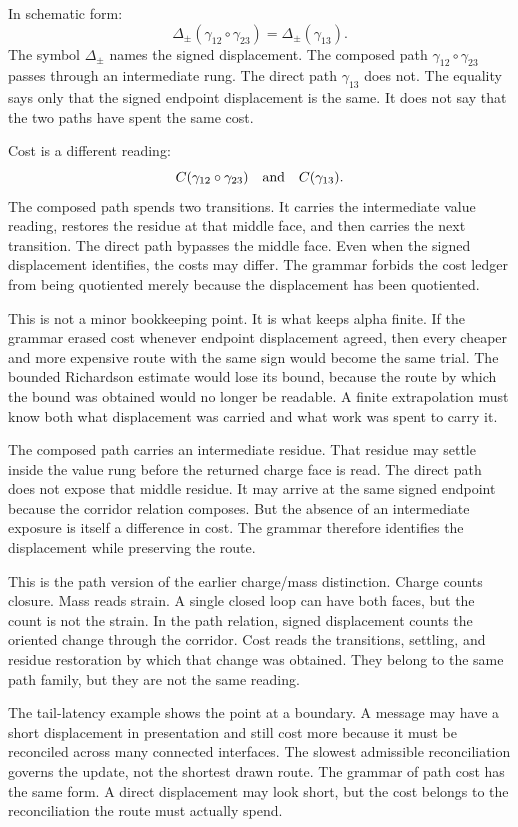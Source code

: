 In schematic form:
\[
  \Delta_{\pm}(\gamma_{12}\circ\gamma_{23})
    = \Delta_{\pm}(\gamma_{13}) .
\]
The symbol \(\Delta_{\pm}\) names the signed displacement. The composed path
\(\gamma_{12}\circ\gamma_{23}\) passes through an intermediate rung. The
direct path \(\gamma_{13}\) does not. The equality says only that the signed
endpoint displacement is the same. It does not say that the two paths have
spent the same cost.

Cost is a different reading:
\[
  C(\gamma_{12}\circ\gamma_{23})
    \quad\hbox{and}\quad
  C(\gamma_{13}) .
\]
The composed path spends two transitions. It carries the intermediate value
reading, restores the residue at that middle face, and then carries the next
transition. The direct path bypasses the middle face. Even when the signed
displacement identifies, the costs may differ. The grammar forbids the cost
ledger from being quotiented merely because the displacement has been
quotiented.

This is not a minor bookkeeping point. It is what keeps alpha finite. If the
grammar erased cost whenever endpoint displacement agreed, then every cheaper
and more expensive route with the same sign would become the same trial. The
bounded Richardson estimate would lose its bound, because the route by which
the bound was obtained would no longer be readable. A finite extrapolation
must know both what displacement was carried and what work was spent to carry
it.

The composed path carries an intermediate residue. That residue may settle
inside the value rung before the returned charge face is read. The direct
path does not expose that middle residue. It may arrive at the same signed
endpoint because the corridor relation composes. But the absence of an
intermediate exposure is itself a difference in cost. The grammar therefore
identifies the displacement while preserving the route.

This is the path version of the earlier charge/mass distinction. Charge
counts closure. Mass reads strain. A single closed loop can have both faces,
but the count is not the strain. In the path relation, signed displacement
counts the oriented change through the corridor. Cost reads the transitions,
settling, and residue restoration by which that change was obtained. They
belong to the same path family, but they are not the same reading.

The tail-latency example shows the point at a boundary. A message may have a
short displacement in presentation and still cost more because it must be
reconciled across many connected interfaces. The slowest admissible
reconciliation governs the update, not the shortest drawn route. The grammar
of path cost has the same form. A direct displacement may look short, but
the cost belongs to the reconciliation the route must actually spend.

